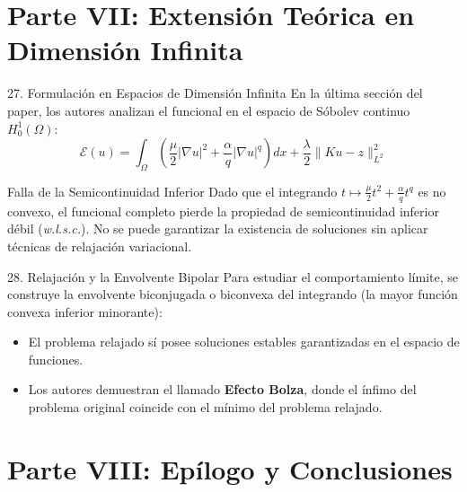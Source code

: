 \documentclass[aspectratio=169,11pt]{beamer}
\begin{document}
\section{Parte VII: Extensión Teórica en Dimensión Infinita}

\begin{frame}{27. Formulación en Espacios de Dimensión Infinita}
    En la última sección del paper, los autores analizan el funcional en el espacio de Sóbolev continuo $H^1_0(\Omega)$:
    \begin{equation}
        \mathcal{E}(u) = \int_\Omega \left( \frac{\mu}{2}|\nabla u|^2 + \frac{\alpha}{q}|\nabla u|^q \right) dx + \frac{\lambda}{2}\|Ku - z\|_{L^2}^2
    \end{equation}
    \begin{alertblock}{Falla de la Semicontinuidad Inferior}
        Dado que el integrando $t \mapsto \frac{\mu}{2}t^2 + \frac{\alpha}{q}t^q$ es \alert{no convexo}, el funcional completo pierde la propiedad de semicontinuidad inferior débil (\textit{w.l.s.c.}). No se puede garantizar la existencia de soluciones sin aplicar técnicas de relajación variacional.
    \end{alertblock}
\end{frame}

\begin{frame}{28. Relajación y la Envolvente Bipolar}
    Para estudiar el comportamiento límite, se construye la envolvente biconjugada o biconvexa del integrando (la mayor función convexa inferior minorante):
    \begin{itemize}
        \item El problema relajado sí posee soluciones estables garantizadas en el espacio de funciones.
        \item Los autores demuestran el llamado \textbf{Efecto Bolza}, donde el ínfimo del problema original coincide con el mínimo del problema relajado.
    \end{itemize}
\end{frame}

\section{Parte VIII: Epílogo y Conclusiones}
\end{document}
